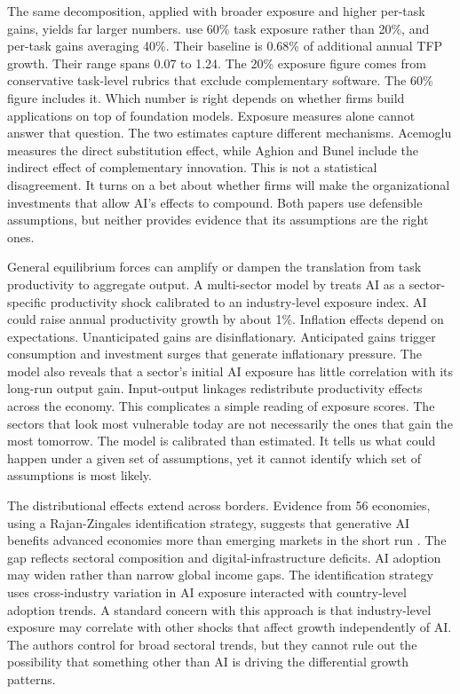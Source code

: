 \documentclass[12pt]{article}
\begin{document}
The same decomposition, applied with broader exposure and higher per-task gains, yields far larger numbers. \citet{aghion2024growth} use 60\% task exposure rather than 20\%, and per-task gains averaging 40\%. Their baseline is 0.68\% of additional annual TFP growth. Their range spans 0.07 to 1.24. The 20\% exposure figure comes from conservative task-level rubrics that exclude complementary software. The 60\% figure includes it. Which number is right depends on whether firms build applications on top of foundation models. Exposure measures alone cannot answer that question. The two estimates capture different mechanisms. Acemoglu measures the direct substitution effect, while Aghion and Bunel include the indirect effect of complementary innovation. This is not a statistical disagreement. It turns on a bet about whether firms will make the organizational investments that allow AI's effects to compound. Both papers use defensible assumptions, but neither provides evidence that its assumptions are the right ones.

General equilibrium forces can amplify or dampen the translation from task productivity to aggregate output. A multi-sector model by \citet{aldasoro2024output} treats AI as a sector-specific productivity shock calibrated to an industry-level exposure index. AI could raise annual productivity growth by about 1\%. Inflation effects depend on expectations. Unanticipated gains are disinflationary. Anticipated gains trigger consumption and investment surges that generate inflationary pressure. The model also reveals that a sector's initial AI exposure has little correlation with its long-run output gain. Input-output linkages redistribute productivity effects across the economy. This complicates a simple reading of exposure scores. The sectors that look most vulnerable today are not necessarily the ones that gain the most tomorrow. The model is calibrated than estimated. It tells us what could happen under a given set of assumptions, yet it cannot identify which set of assumptions is most likely.

The distributional effects extend across borders. Evidence from 56 economies, using a Rajan-Zingales identification strategy, suggests that generative AI benefits advanced economies more than emerging markets in the short run \citep{gambacorta2026growth}. The gap reflects sectoral composition and digital-infrastructure deficits. AI adoption may widen rather than narrow global income gaps. The identification strategy uses cross-industry variation in AI exposure interacted with country-level adoption trends. A standard concern with this approach is that industry-level exposure may correlate with other shocks that affect growth independently of AI. The authors control for broad sectoral trends, but they cannot rule out the possibility that something other than AI is driving the differential growth patterns.
\end{document}
